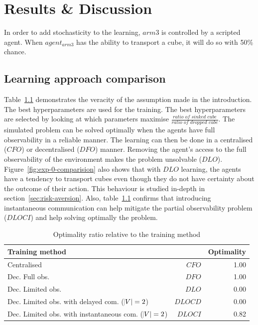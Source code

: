 \chapter{Results \& Discussion}
\label{chap:discussion}

In order to add stochasticity to the learning, $arm3$ is controlled by a scripted agent. When $agent_{arm3}$ has the ability to transport a cube, it will do so with 50\% chance. 


\section{Learning approach comparison} 

Table~\ref{tab:exp-0-comparison} demonstrates the veracity of the assumption made in the introduction. The best hyperparameters are used for the training. The best hyperparameters are selected by looking at which parameters maximise $\frac{\textit{ratio of sinked cube}}{\textit{ratio of dropped cube}}$. The simulated problem can be solved optimally when the agents have full observability in a reliable manner. The learning can then be done in a centralised ($CFO$) or decentralised ($DFO$) manner. Removing the agent's access to the full observability of the environment makes the problem unsolvable ($DLO$). Figure~\ref{fig:exp-0-comparision} also shows that with $DLO$ learning, the agents have a tendency to transport cubes even though they do not have certainty about the outcome of their action. This behaviour is studied in-depth in section~\ref{sec:risk-aversion}. Also, table~\ref{tab:exp-0-comparison} confirms that introducing instantaneous communication can help mitigate the partial observability problem ($DLOCI$) and help solving optimally the problem.


\begin{table}[ht]
\centering
\begin{tabular}{lrr}
\toprule
Training method  &            &  Optimality      \\
\midrule
Centralised & $CFO$  & 1.00 \\
Dec. Full obs. &  $DFO$  & 1.00 \\
Dec. Limited obs. & $DLO$  & 0.00 \\
Dec. Limited obs. with delayed com. ($\abs{V}  = 2$) & $DLOCD$ & 0.00 \\
Dec. Limited obs. with instantaneous com. ($\abs{V}  = 2$) & $DLOCI$ & 0.82 \\
\bottomrule
\end{tabular}
\caption[Optimality ratio relative to the training method]{Optimality ratio relative to the training method}
\label{tab:exp-0-comparison}
\end{table}


